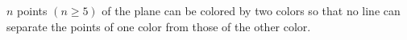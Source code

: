 $n$ points $(n \geq 5)$ of the plane can be colored by two colors so that no line can separate the points of one color from those of the other color.
